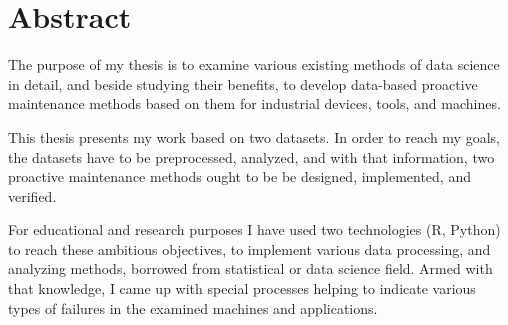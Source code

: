 \chapter*{Abstract}

The purpose of my thesis is to examine various existing methods of data science in detail, and beside studying their benefits, to develop data-based proactive maintenance methods based on them for industrial devices, tools, and machines.

This thesis presents my work based on two datasets. In order to reach my goals, the datasets have to be preprocessed, analyzed, and with that information, two proactive maintenance methods ought to be be designed, implemented, and verified.

For educational and research purposes I have used two technologies (R, Python) to reach these ambitious objectives, to implement various data processing, and analyzing methods, borrowed from statistical or data science field. Armed with that knowledge, I came up with special processes helping to indicate various types of failures in the examined machines and applications.
